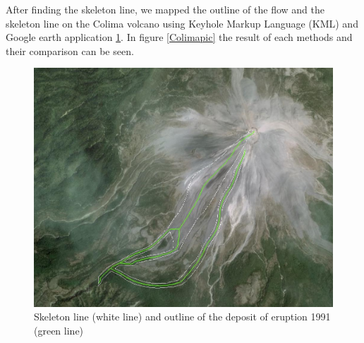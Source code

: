 \documentclass[letterpaper,10pt]{article}
\begin{document}
After finding the skeleton line, we mapped the outline of the flow and the skeleton line on the Colima volcano 
using Keyhole Markup Language (KML) and Google earth application \ref{skel_outline}. In figure \ref{Colimapic} the result of each methods and their comparison can be seen. 
\begin{figure}[H]
\centerline{\includegraphics[width=.35\textwidth]{IMAGES/skeleton_outline1.jpg}}
\caption{Skeleton line (white line) and outline of the deposit of eruption 1991 (green line)}
\label{skel_outline}
\end{figure}
\end{document}
